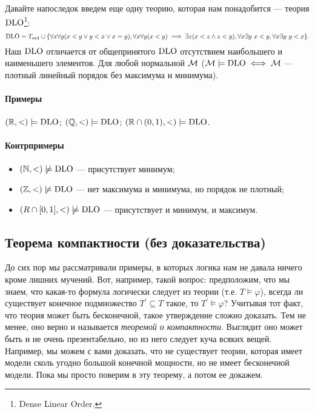 Давайте напоследок введем еще одну теорию, которая нам понадобится --- теория $\operatorname{DLO}$\footnote{Dense Linear Order.}:
$$
    \operatorname{DLO} = T_{\text{ord}} \cup \{\forall x \forall y (x < y \lor y < x \lor x = y), \forall x \forall y (x < y) \implies \exists z (x < z \land z < y), \forall x \exists y~ x < y, \forall x \exists y~ y < x\}.
$$
Наш $\operatorname{DLO}$ отличается от общепринятого $\operatorname{DLO}$ отсутствием наибольшего и наименьшего элементов.
Для любой нормальной $\mathcal{M}$ ($\mathcal{M} \models \operatorname{DLO} \iff \mathcal{M}$ --- плотный линейный порядок без максимума и минимума).

\paragraph{Примеры}
$(\mathbb{R}, <) \models \operatorname{DLO}$; $(\mathbb{Q}, <) \models \operatorname{DLO}$; $(\mathbb{R} \cap (0, 1), <) \models \operatorname{DLO}$.

\paragraph{Контрпримеры}
\begin{itemize}
    \item $(\N, <) \centernot\models \DLO$ --- присутствует минимум;
    \item $(\Z, <) \centernot\models \DLO$ --- нет максимума и минимума, но порядок не плотный;
    \item $(R \cap [0, 1], <) \centernot\models \DLO$ --- присутствует и минимум, и максимум.
\end{itemize}

\subsection{Теорема компактности (без доказательства)}

До сих пор мы рассматривали примеры, в которых логика нам не давала ничего кроме лишних мучений.
Вот, например, такой вопрос: предположим, что мы знаем, что какая-то формула логически следует из теории (т.е. $T \models \varphi$), всегда ли существует конечное подмножество $T^{\prime} \subseteq T$ такое, то $T^{\prime} \models \varphi$?
Учитывая тот факт, что теория может быть бесконечной, такое утверждение сложно доказать.
Тем не менее, оно верно и называется {\it теоремой о компактности}.
Выглядит оно может быть и не очень презентабельно, но из него следует куча всяких вещей.
Например, мы можем с вами доказать, что не существует теории, которая имеет модели сколь угодно большой конечной мощности, но не имеет бесконечной модели.
Пока мы просто поверим в эту теорему, а потом ее докажем.

